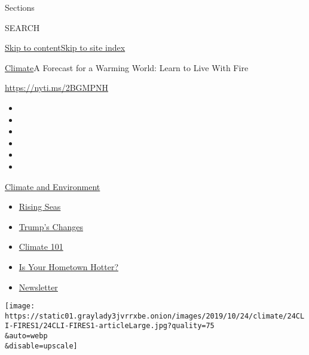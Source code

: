 Sections

SEARCH

\protect\hyperlink{site-content}{Skip to
content}\protect\hyperlink{site-index}{Skip to site index}

\href{/section/climate}{Climate}\textbar{}A Forecast for a Warming
World: Learn to Live With Fire

\url{https://nyti.ms/2BGMPNH}

\begin{itemize}
\item
\item
\item
\item
\item
\item
\end{itemize}

\href{https://www.nytimes3xbfgragh.onion/section/climate?action=click\&pgtype=Article\&state=default\&region=TOP_BANNER\&context=storylines_menu}{Climate
and Environment}

\begin{itemize}
\tightlist
\item
  \href{https://www.nytimes3xbfgragh.onion/2020/07/30/climate/sea-level-inland-floods.html?action=click\&pgtype=Article\&state=default\&region=TOP_BANNER\&context=storylines_menu}{Rising
  Seas}
\item
  \href{https://www.nytimes3xbfgragh.onion/interactive/2020/climate/trump-environment-rollbacks.html?action=click\&pgtype=Article\&state=default\&region=TOP_BANNER\&context=storylines_menu}{Trump's
  Changes}
\item
  \href{https://www.nytimes3xbfgragh.onion/interactive/2020/04/19/climate/climate-crash-course-1.html?action=click\&pgtype=Article\&state=default\&region=TOP_BANNER\&context=storylines_menu}{Climate
  101}
\item
  \href{https://www.nytimes3xbfgragh.onion/interactive/2018/08/30/climate/how-much-hotter-is-your-hometown.html?action=click\&pgtype=Article\&state=default\&region=TOP_BANNER\&context=storylines_menu}{Is
  Your Hometown Hotter?}
\item
  \href{https://www.nytimes3xbfgragh.onion/newsletters/climate-change?action=click\&pgtype=Article\&state=default\&region=TOP_BANNER\&context=storylines_menu}{Newsletter}
\end{itemize}

\texttt{[image: https://static01.graylady3jvrrxbe.onion/images/2019/10/24/climate/24CLI-FIRES1/24CLI-FIRES1-articleLarge.jpg?quality=75\\\&auto=webp\\\&disable=upscale]}

